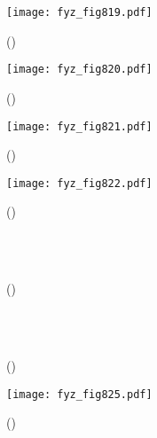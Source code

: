    \begin{figure}[ht!] %
      \centering
      \texttt{[image: fyz\_fig819.pdf]}
      \caption{
               (\cite[s.~707]{Feynman02})}
      \label{fyz:fig819}
    \end{figure}

    \begin{figure}[ht!] %
      \centering
      \texttt{[image: fyz\_fig820.pdf]}
      \caption{
               (\cite[s.~707]{Feynman02})}
      \label{fyz:fig820}
    \end{figure}

    \begin{figure}[ht!] %
      \centering
      \texttt{[image: fyz\_fig821.pdf]}
      \caption{
               (\cite[s.~707]{Feynman02})}
      \label{fyz:fig821}
    \end{figure}

    \begin{figure}[ht!] %
      \centering
      \texttt{[image: fyz\_fig822.pdf]}
      \caption{
               (\cite[s.~707]{Feynman02})}
      \label{fyz:fig822}
    \end{figure}

    \begin{figure}[ht!]
      \centering
                     \\
                     \\
      \caption{
               (\cite[s.~748]{Feynman02})}
      \label{fyz:fig823}
    \end{figure}

    \begin{figure}[ht!]
      \centering
                     \\
                     \\
      \caption{
               (\cite[s.~748]{Feynman02})}
      \label{fyz:fig824}
    \end{figure}

    \begin{figure}[ht!] %
      \centering
      \texttt{[image: fyz\_fig825.pdf]}
      \caption{
               (\cite[s.~707]{Feynman02})}
      \label{fyz:fig825}
    \end{figure}

